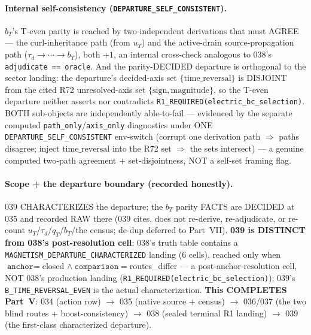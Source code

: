 \paragraph{Internal self-consistency (\texttt{DEPARTURE\_SELF\_CONSISTENT}).}
\(b_T\)'s T-even parity is reached by two independent derivations that must AGREE ---
the curl-inheritance path (from \(u_T\)) and the active-drain source-propagation path
(\(\tau_d\to\cdots\to b_T\)), both \(+1\), an internal cross-check analogous to 038's
\texttt{adjudicate == oracle}. And the parity-DECIDED departure is orthogonal to the
sector landing: the departure's decided-axis set \(\{\text{time\_reversal}\}\) is
DISJOINT from the cited R72 unresolved-axis set \(\{\text{sign},\text{magnitude}\}\),
so the T-even departure neither asserts nor contradicts
\texttt{R1\_REQUIRED(electric\_bc\_selection)}. BOTH sub-objects are independently
able-to-fail --- evidenced by the separate computed \texttt{path\_only}/\texttt{axis\_only}
diagnostics under ONE \texttt{DEPARTURE\_SELF\_CONSISTENT} env-switch (corrupt one derivation
path \(\Rightarrow\) paths disagree; inject \(\text{time\_reversal}\) into the R72 set
\(\Rightarrow\) the sets intersect) --- a genuine computed two-path agreement +
set-disjointness, NOT a self-set framing flag.

\paragraph{Scope + the departure boundary (recorded honestly).}
039 CHARACTERIZES the departure; the \(b_T\) parity FACTS are DECIDED at 035 and
recorded RAW there (039 cites, does not re-derive, re-adjudicate, or re-count
\(u_T\)/\(\tau_d\)/\(q_T\)/\(b_T\)/the census; de-dup deferred to Part~VII).
\textbf{039 is DISTINCT from 038's post-resolution cell}: 038's truth table contains a
\texttt{MAGNETISM\_DEPARTURE\_CHARACTERIZED} landing (6 cells), reached only when
\(\texttt{anchor}=\)closed \(\wedge\ \texttt{comparison}=\)routes\_differ --- a
post-anchor-resolution cell, NOT 038's production landing
(\texttt{R1\_REQUIRED(electric\_bc\_selection)}); 039's \texttt{B\_TIME\_REVERSAL\_EVEN}
is the actual characterization. \textbf{This COMPLETES Part~V}: 034 (action row) $\to$
035 (native source + census) $\to$ 036/037 (the two blind routes + boost-consistency)
$\to$ 038 (sealed terminal R1 landing) $\to$ 039 (the first-class characterized
departure).

